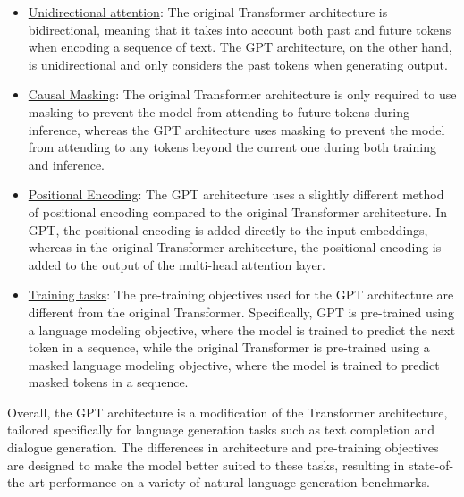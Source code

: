 \begin{itemize}
    \item \underline{Unidirectional attention}: The original Transformer architecture is bidirectional, meaning that it takes into account both past and future tokens when encoding a sequence of text. The GPT architecture, on the other hand, is unidirectional and only considers the past tokens when generating output.
    \item \underline{Causal Masking}: The original Transformer architecture is only required to use masking to prevent the model from attending to future tokens during inference, whereas the GPT architecture uses masking to prevent the model from attending to any tokens beyond the current one during both training and inference.
    \item \underline{Positional Encoding}: The GPT architecture uses a slightly different method of positional encoding compared to the original Transformer architecture. In GPT, the positional encoding is added directly to the input embeddings, whereas in the original Transformer architecture, the positional encoding is added to the output of the multi-head attention layer.
    \item \underline{Training tasks}: The pre-training objectives used for the GPT architecture are different from the original Transformer. Specifically, GPT is pre-trained using a language modeling objective, where the model is trained to predict the next token in a sequence, while the original Transformer is pre-trained using a masked language modeling objective, where the model is trained to predict masked tokens in a sequence.
\end{itemize}

Overall, the GPT architecture is a modification of the Transformer architecture, tailored specifically for language generation tasks such as text completion and dialogue generation. The differences in architecture and pre-training objectives are designed to make the model better suited to these tasks, resulting in state-of-the-art performance on a variety of natural language generation benchmarks.


